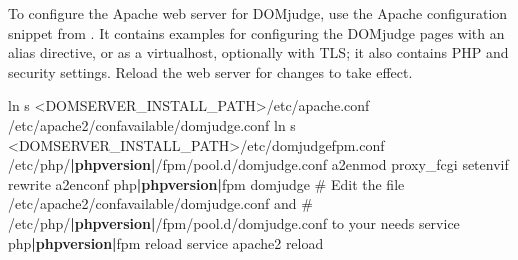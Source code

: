 \documentclass[a4paper,10pt,english,openany]{sphinxmanual}
\begin{document}
\begin{sphinxVerbatim}[commandchars=\\\{\}]
   
   
  
  
\end{sphinxVerbatim}

\sphinxAtStartPar
To configure the Apache web server for DOMjudge, use the Apache
configuration snippet from . It contains
examples for configuring the DOMjudge pages with an alias directive,
or as a virtualhost, optionally with TLS; it also contains PHP and security
settings. Reload the web server for changes to take effect.
\begin{sphinxalltt}
ln \sphinxhyphen{}s \textless{}DOMSERVER\_INSTALL\_PATH\textgreater{}/etc/apache.conf /etc/apache2/conf\sphinxhyphen{}available/domjudge.conf
ln \sphinxhyphen{}s \textless{}DOMSERVER\_INSTALL\_PATH\textgreater{}/etc/domjudge\sphinxhyphen{}fpm.conf /etc/php/{\color{red}\bfseries{}|phpversion|}/fpm/pool.d/domjudge.conf
a2enmod proxy\_fcgi setenvif rewrite
a2enconf php{\color{red}\bfseries{}|phpversion|}\sphinxhyphen{}fpm domjudge
\# Edit the file /etc/apache2/conf\sphinxhyphen{}available/domjudge.conf and
\# /etc/php/{\color{red}\bfseries{}|phpversion|}/fpm/pool.d/domjudge.conf to your needs
service php{\color{red}\bfseries{}|phpversion|}\sphinxhyphen{}fpm reload
service apache2 reload
\end{sphinxalltt}
\end{document}
